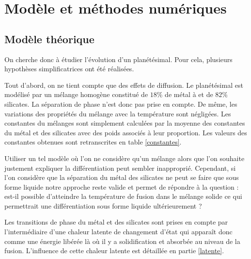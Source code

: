 \documentclass[10pt,a4paper]{article}
\numberwithin{equation}{section}
\begin{document}
\section{Modèle et méthodes numériques}
\subsection{Modèle théorique}

On cherche donc à étudier l'évolution d'un planétésimal. Pour cela, plusieurs hypothèses simplificatrices ont été réalisées. 
\medskip

Tout d'abord, on ne tient compte que des effets de diffusion. Le planétésimal est modélisé par un mélange homogène constitué de $18\%$ de métal à et de $82\%$ silicates. La séparation de phase n'est donc pas prise en compte. De même, les variations des propriétés du mélange avec la température sont négligées. Les constantes du mélanges sont simplement calculées par la moyenne des constantes du métal et des silicates avec des poids associés à leur proportion. Les valeurs des constantes obtenues sont retranscrites en table \ref{constantes}.
\medskip

Utiliser un tel modèle où l'on ne considère qu'un mélange alors que l'on souhaite justement expliquer la différentiation peut sembler inapproprié. Cependant, si l'on considère que la séparation du métal des silicates ne peut se faire que sous forme liquide notre approche reste valide et permet de répondre à la question : est-il possible d'atteindre la température de fusion dans le mélange solide ce qui permettrait une différentiation sous forme liquide ultérieurement ? 
\medskip

Les transitions de phase du métal et des silicates sont prises en compte par l'intermédiaire d'une chaleur latente de changement d'état qui apparaît donc comme une énergie libérée là où il y a solidification et absorbée au niveau de la fusion. L'influence de cette chaleur latente est détaillée en partie \ref{latente}.
\end{document}
